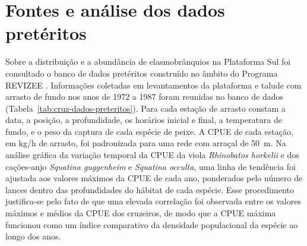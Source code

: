 \documentclass[a4paper,11pt,twoside,showtrims,onecolumn,openright,final]{memoir}
\begin{document}
\section*{Fontes e análise dos dados pretéritos}

Sobre a distribuição e a abundância de elasmobrânquios na Plataforma Sul foi 
consultado o banco de dados pretéritos construído no âmbito do Programa REVIZEE \citep{klippel2000c}.
Informações coletadas em levantamentos da plataforma e talude com arrasto de fundo nos anos 
de 1972 a 1987 foram reunidas no banco de dados (Tabela~\ref{tab:cruz-dados-preteritos}).
Para cada estação de arrasto constam a data, a posição, a profundidade, os horários 
inicial e final, a temperatura de fundo, e o peso da captura de cada espécie de peixe. 
A CPUE de cada estação, em kg/h de arrasto, foi padronizada para uma rede com arraçal de 50~m.
Na análise gráfica da variação temporal da CPUE da viola \emph{Rhinobatos horkelii} e 
dos cações-anjo \emph{Squatina guggenheim} e \emph{Squatina occulta}, uma linha de tendência foi 
ajustada aos valores máximos da CPUE de cada ano, ponderados pelo número de lances 
dentro das profundidades do hábitat de cada espécie. 
Esse procedimento justifica-se pelo fato de que uma elevada correlação foi observada 
entre os valores máximos e médios da CPUE dos cruzeiros, de modo que a CPUE máxima 
funcionou como um índice comparativo da densidade populacional da espécie ao longo dos anos.


\end{document}
